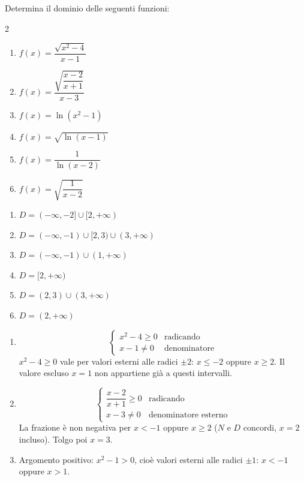 \begin{question}[ID=1.3, subtitle={Dominio di funzioni con radicali e logaritmi}, difficulty=media, tags={funzioni, dominio}]
Determina il dominio delle seguenti funzioni:
\begin{multicols}{2}
\begin{enumerate}[leftmargin=3.2cm]
    \item $f(x)=\dfrac{\sqrt{x^2-4}}{x-1}$
    \item $f(x)=\dfrac{\sqrt{\dfrac{x-2}{x+1}}}{x-3}$
    \item $f(x)=\ln(x^2-1)$
    \item $f(x)=\sqrt{\ln(x-1)}$
    \item $f(x)=\dfrac{1}{\ln(x-2)}$
    \item $f(x)=\sqrt{\dfrac{1}{x-2}}$
\end{enumerate}
\end{multicols}
\begin{solution}
\begin{enumerate}
    \item $D=(-\infty,-2]\cup[2,+\infty)$
    \item $D=(-\infty,-1)\cup[2,3)\cup(3,+\infty)$
    \item $D=(-\infty,-1)\cup(1,+\infty)$
    \item $D=[2,+\infty)$
    \item $D=(2,3)\cup(3,+\infty)$
    \item $D=(2,+\infty)$
\end{enumerate}
\end{solution}
\begin{explanation}
\begin{enumerate}
    \item \[ \begin{cases} x^2-4\geq 0 & \text{radicando}\\ x-1\neq 0 & \text{denominatore}\end{cases} \]
    $x^2-4\geq0$ vale per valori esterni alle radici $\pm2$: $x\leq -2$ oppure $x\geq 2$. Il valore escluso $x=1$ non appartiene già a questi intervalli.
    \item \[ \begin{cases} \dfrac{x-2}{x+1}\geq 0 & \text{radicando}\\ x-3\neq 0 & \text{denominatore esterno}\end{cases} \]
    La frazione è non negativa per $x<-1$ oppure $x\geq 2$ ($N$ e $D$ concordi, $x=2$ incluso). Tolgo poi $x=3$.
    \item Argomento positivo: $x^2-1>0$, cioè valori esterni alle radici $\pm1$: $x<-1$ oppure $x>1$.

\end{enumerate}
\end{explanation}
\end{question}
